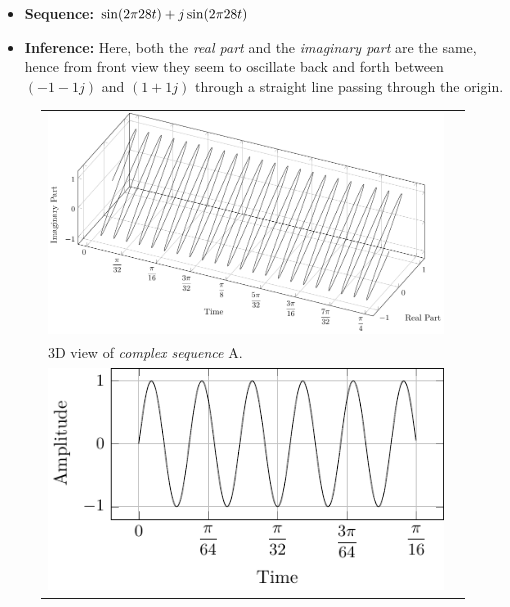 \documentclass[../../course]{subfiles}
\begin{document}
\begin{itemize} [label=]

    \item \textbf{Sequence:} $\sin(2 \pi 28 t) + j \sin(2 \pi 28 t)$

    \item \textbf{Inference:} Here, both the \emph{real part} and the \emph{imaginary part}
        are the same, hence from front view they seem to oscillate back and forth between $(-1 -1j)$
        and $(1 + 1j)$ through a straight line passing through the origin.

\end{itemize}

\begin{figure} [H]

    \renewcommand{\arraystretch}{0.75}
    \centering
    \begin{NiceTabularX} {\textwidth} {
            *{2}{>{\centering\arraybackslash}X}
        }

         {
             {
                \includegraphics[height = \textheight] {tikzpics/plotComplexA.pdf}
            }
        }

        &
        \\

         {
            \vbox{
                 {3D view of \emph{complex sequence} A.}
                \label{plt:cmplxA}
            }
        }

        &
        \\

         {
             {
                \includegraphics[height = \textheight] {tikzpics/plotShortX1.pdf}
            }
        }


\end{NiceTabularX}
\end{figure}
\end{document}
